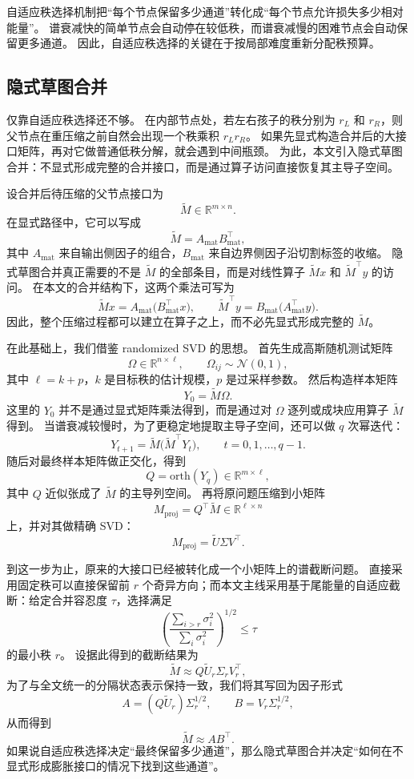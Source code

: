 自适应秩选择机制把“每个节点保留多少通道”转化成“每个节点允许损失多少相对能量”。
谱衰减快的简单节点会自动停在较低秩，而谱衰减慢的困难节点会自动保留更多通道。
因此，自适应秩选择的关键在于按局部难度重新分配秩预算。

\subsection{隐式草图合并}
仅靠自适应秩选择还不够。
在内部节点处，若左右孩子的秩分别为 $r_L$ 和 $r_R$，则父节点在重压缩之前自然会出现一个秩乘积 $r_L r_R$。
如果先显式构造合并后的大接口矩阵，再对它做普通低秩分解，就会遇到中间瓶颈。
为此，本文引入隐式草图合并：不显式形成完整的合并接口，而是通过算子访问直接恢复其主导子空间\cite{halko2011finding,heddes2026approximating}。

设合并后待压缩的父节点接口为
\[
\widetilde M \in \mathbb{R}^{m \times n}.
\]
在显式路径中，它可以写成
\[
\widetilde M = A_{\mathrm{mat}} B_{\mathrm{mat}}^\top,
\]
其中 $A_{\mathrm{mat}}$ 来自输出侧因子的组合，$B_{\mathrm{mat}}$ 来自边界侧因子沿切割标签的收缩。
隐式草图合并真正需要的不是 $\widetilde M$ 的全部条目，而是对线性算子 $\widetilde M x$ 和 $\widetilde M^\top y$ 的访问。
在本文的合并结构下，这两个乘法可写为
\[
\widetilde M x = A_{\mathrm{mat}} \bigl(B_{\mathrm{mat}}^\top x\bigr),
\qquad
\widetilde M^\top y = B_{\mathrm{mat}} \bigl(A_{\mathrm{mat}}^\top y\bigr).
\]
因此，整个压缩过程都可以建立在算子之上，而不必先显式形成完整的 $\widetilde M$。

在此基础上，我们借鉴 randomized SVD 的思想\cite{halko2011finding}。
首先生成高斯随机测试矩阵
\[
\Omega \in \mathbb{R}^{n \times \ell},
\qquad
\Omega_{ij} \sim \mathcal N(0,1),
\]
其中 $\ell = k + p$，$k$ 是目标秩的估计规模，$p$ 是过采样参数。
然后构造样本矩阵
\[
Y_0 = \widetilde M \Omega.
\]
这里的 $Y_0$ 并不是通过显式矩阵乘法得到，而是通过对 $\Omega$ 逐列或成块应用算子 $\widetilde M$ 得到。
当谱衰减较慢时，为了更稳定地提取主导子空间，还可以做 $q$ 次幂迭代：
\[
Y_{t+1} = \widetilde M \bigl(\widetilde M^\top Y_t\bigr),
\qquad t=0,1,\ldots,q-1.
\]
随后对最终样本矩阵做正交化，得到
\[
Q = \mathrm{orth}(Y_q) \in \mathbb{R}^{m \times \ell},
\]
其中 $Q$ 近似张成了 $\widetilde M$ 的主导列空间。
再将原问题压缩到小矩阵
\[
M_{\mathrm{proj}} = Q^\top \widetilde M 
\in \mathbb{R}^{\ell \times n}
\]
上，并对其做精确 SVD：
\[
M_{\mathrm{proj}} = \widetilde U \Sigma V^\top.
\]

到这一步为止，原来的大接口已经被转化成一个小矩阵上的谱截断问题。
直接采用固定秩可以直接保留前 $r$ 个奇异方向；而本文主线采用基于尾能量的自适应截断：给定合并容忍度 $\tau$，选择满足
\[
\left(
\frac{\sum_{i>r} \sigma_i^2}{\sum_i \sigma_i^2}
\right)^{1/2}
\le \tau
\]
的最小秩 $r$。
设据此得到的截断结果为
\[
\widetilde M \approx Q \widetilde U_r \Sigma_r V_r^\top,
\]
为了与全文统一的分隔状态表示保持一致，我们将其写回为因子形式
\[
A = (Q \widetilde U_r) \Sigma_r^{1/2},
\qquad
B = V_r \Sigma_r^{1/2},
\]
从而得到
\[
\widetilde M \approx A B^\top.
\]
如果说自适应秩选择决定“最终保留多少通道”，那么隐式草图合并决定“如何在不显式形成膨胀接口的情况下找到这些通道”。

